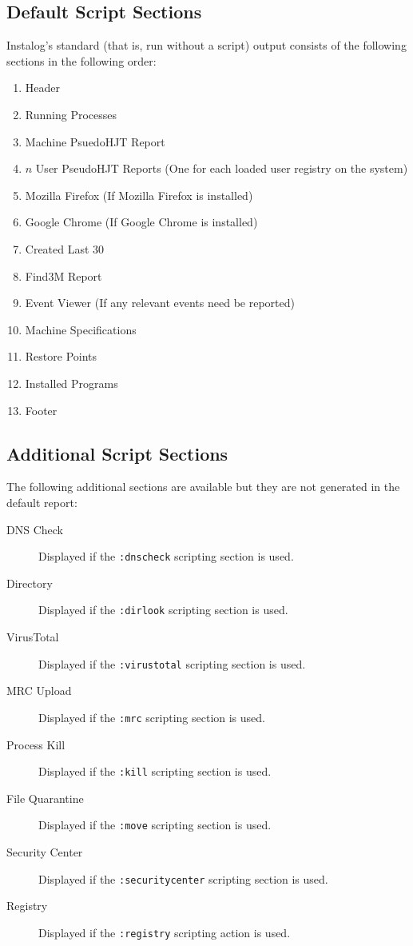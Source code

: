 \subsection{Default Script Sections} \label{sec:default_script_sections}
Instalog's standard (that is, run without a script) output consists of the
following sections in the following order:
\begin{enumerate}
    \item Header
    \item Running Processes
    \item Machine PsuedoHJT Report
    \item $n$ User PseudoHJT Reports (One for each loaded user registry on the
    system)
    \item Mozilla Firefox (If Mozilla Firefox is installed)
    \item Google Chrome (If Google Chrome is installed)
    \item Created Last 30
    \item Find3M Report
    \item Event Viewer (If any relevant events need be reported)
    \item Machine Specifications
    \item Restore Points
    \item Installed Programs
    \item Footer
\end{enumerate}

\subsection{Additional Script Sections}
The following additional sections are available but they are not
generated in the default report:
\begin{description}
\item[DNS Check] Displayed if the \verb|:dnscheck| scripting section is used.
\item[Directory] Displayed if the \verb|:dirlook| scripting section is used.
\item[VirusTotal] Displayed if the \verb|:virustotal| scripting section is used.
\item[MRC Upload] Displayed if the \verb|:mrc| scripting section is used.
\item[Process Kill] Displayed if the \verb|:kill| scripting section is used.
\item[File Quarantine] Displayed if the \verb|:move| scripting section is used.
\item[Security Center] Displayed if the \verb|:securitycenter| scripting section
is used.
\item[Registry] Displayed if the \verb|:registry| scripting action is used.
\end{description}